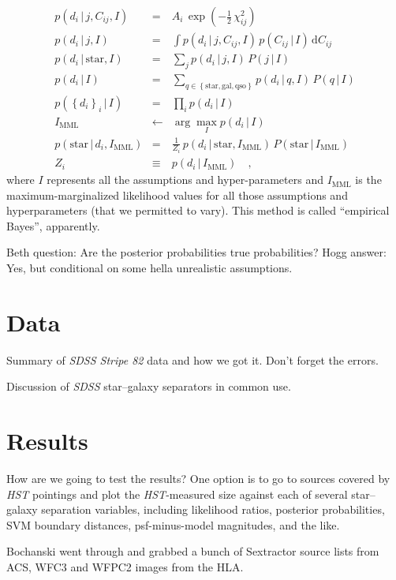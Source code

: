 \documentclass[12pt]{article}
\newcommand{\project}[1]{\textsl{#1}}
\newcommand{\given}{\,|\,}
\newcommand{\dd}{\mathrm{d}}
\newcommand{\setofall}[1]{\left\{{#1}\right\}}
\renewcommand{\star}{\mathrm{star}}
\newcommand{\galaxy}{\mathrm{gal}}
\newcommand{\quasar}{\mathrm{qso}}
\newcommand{\mml}{\mathrm{MML}}
\begin{document}
\begin{eqnarray}
p(d_i\given j,C_{ij},I) &=& A_i\,\exp(-\frac{1}{2}\,\chi^2_{ij})
\\
p(d_i\given j,I) &=& \int p(d_i\given j,C_{ij},I)\,p(C_{ij}\given I)\,\dd C_{ij}
\\
p(d_i\given \star,I) &=& \sum_j p(d_i\given j,I)\,P(j\given I)
\\
p(d_i\given I) &=& \sum_{q\in\setofall{\star,\galaxy,\quasar}} p(d_i\given q,I)\,P(q\given I)
\\
p(\setofall{d_i}_i\given I) &=& \prod_i p(d_i\given I)
\\
I_{\mml} &\leftarrow& \arg\max_I p(d_i\given I)
\\
p(\star\given d_i,I_{\mml}) &=& \frac{1}{Z_i}\,p(d_i\given \star,I_{\mml})\,P(\star\given I_{\mml})
\\
Z_i &\equiv& p(d_i\given I_{\mml})
\quad ,
\end{eqnarray}
where $I$ represents all the assumptions and hyper-parameters and
$I_{\mml}$ is the maximum-marginalized likelihood values for all those
assumptions and hyperparameters (that we permitted to vary).  This
method is called ``empirical Bayes'', apparently.

Beth question: Are the posterior probabilities true probabilities?
Hogg answer: Yes, but conditional on some hella unrealistic
assumptions.

\section{Data}

Summary of \project{SDSS Stripe 82} data and how we got it.  Don't
forget the errors.

Discussion of \project{SDSS} star--galaxy separators in common use.

\section{Results}

How are we going to test the results?  One option is to go to sources
covered by \project{HST} pointings and plot the \project{HST}-measured
size against each of several star--galaxy separation variables,
including likelihood ratios, posterior probabilities, SVM boundary
distances, psf-minus-model magnitudes, and the like.

Bochanski went through and grabbed a bunch of Sextractor source lists
from ACS, WFC3 and WFPC2 images from the HLA.
\end{document}
